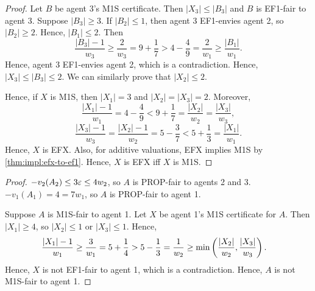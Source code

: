 \begin{proof}
Let $B$ be agent 3's M1S certificate.
Then $|X_3| \le |B_3|$ and $B$ is EF1-fair to agent 3.
Suppose $|B_3| \ge 3$. If $|B_2| \le 1$, then agent 3 EF1-envies agent 2, so $|B_2| \ge 2$.
Hence, $|B_1| \le 2$. Then
\[ \frac{|B_3|-1}{w_3} \ge \frac{2}{w_3} = 9 + \frac{1}{7} > 4 - \frac{4}{9} = \frac{2}{w_1} \ge \frac{|B_1|}{w_1}. \]
Hence, agent 3 EF1-envies agent 2, which is a contradiction.
Hence, $|X_3| \le |B_3| \le 2$.
We can similarly prove that $|X_2| \le 2$.

Hence, if $X$ is M1S, then $|X_1| = 3$ and $|X_2| = |X_3| = 2$. Moreover,
\[ \frac{|X_1|-1}{w_1} = 4 - \frac{4}{9} < 9 + \frac{1}{7} = \frac{|X_2|}{w_2} = \frac{|X_3|}{w_3}, \]
\[ \frac{|X_3|-1}{w_3} = \frac{|X_2|-1}{w_2} = 5 - \frac{3}{7} < 5 + \frac{1}{3} = \frac{|X_1|}{w_1}. \]
Hence, $X$ is EFX. Also, for additive valuations, EFX implies M1S by \cref{thm:impl:efx-to-ef1}.
Hence, $X$ is EFX iff $X$ is M1S.
\end{proof}

\begin{proof}
$-v_2(A_2) \le 3\varepsilon \le 4w_2$, so $A$ is PROP-fair to agents 2 and 3.
$-v_1(A_1) = 4 = 7w_1$, so $A$ is PROP-fair to agent 1.

Suppose $A$ is M1S-fair to agent 1.
Let $X$ be agent 1's M1S certificate for $A$.
Then $|X_1| \ge 4$, so $|X_2| \le 1$ or $|X_3| \le 1$. Hence,
\begin{align*}
\frac{|X_1|-1}{w_1} &\ge \frac{3}{w_1} = 5 + \frac{1}{4} > 5 - \frac{1}{3} = \frac{1}{w_2}
    \relax\ge \min\left(\frac{|X_2|}{w_2}, \frac{|X_3|}{w_3}\right).
\end{align*}
Hence, $X$ is not EF1-fair to agent 1, which is a contradiction.
Hence, $A$ is not M1S-fair to agent 1.
\end{proof}

